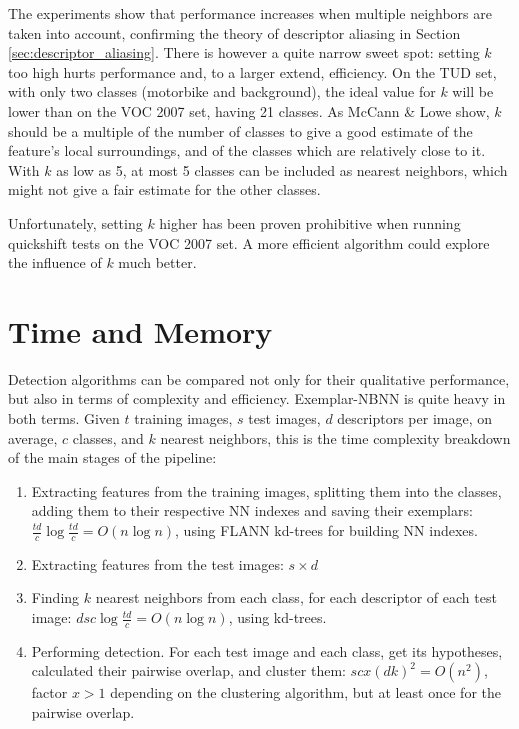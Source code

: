 The experiments show that performance increases when multiple neighbors are taken into account, confirming the theory of descriptor aliasing in Section \ref{sec:descriptor_aliasing}. There is however a quite narrow sweet spot: setting $k$ too high hurts performance and, to a larger extend, efficiency. On the TUD set, with only two classes (motorbike and background), the ideal value for $k$ will be lower than on the VOC 2007 set, having 21 classes. As McCann \& Lowe \cite{mccann2012local} show, $k$ should be a multiple of the number of classes to give a good estimate of the feature's local surroundings, and of the classes which are relatively close to it. With $k$ as low as 5, at most 5 classes can be included as nearest neighbors, which might not give a fair estimate for the other classes.

Unfortunately, setting $k$ higher has been proven prohibitive when running quickshift tests on the VOC 2007 set. A more efficient algorithm could explore the influence of $k$ much better.


\section{Time and Memory} %
\label{sub:time_and_memory_constraints}

Detection algorithms can be compared not only for their qualitative performance, but also in terms of complexity and efficiency. Exemplar-NBNN is quite heavy in both terms. Given $t$ training images, $s$ test images, $d$ descriptors per image, on average, $c$ classes, and $k$ nearest neighbors, this is the time complexity breakdown of the main stages of the pipeline:
\begin{enumerate}
    \item Extracting features from the training images, splitting them into the classes, adding them to their respective NN indexes and saving their exemplars: $\frac{td}{c} \log \frac{td}{c} = O(n\log n)$, using FLANN kd-trees for building NN indexes.
    \item Extracting features from the test images: $s\times d$
    \item Finding $k$ nearest neighbors from each class, for each descriptor of each test image: $d s c \log \frac{td}{c} = O(n \log n)$, using kd-trees.
    \item Performing detection. For each test image and each class, get its hypotheses, calculated their pairwise overlap, and cluster them: $s c x (d k)^2 = O(n^2)$, factor $x>1$ depending on the clustering algorithm, but at least once for the pairwise overlap.
\end{enumerate}

